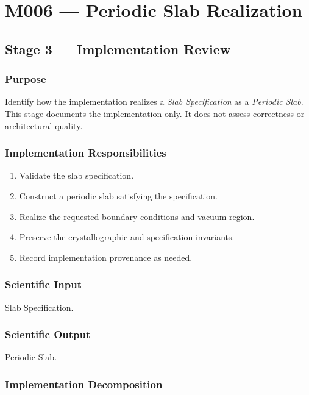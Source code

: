 \chapter{M006 --- Periodic Slab Realization}

\section{Stage 3 --- Implementation Review}

\subsection{Purpose}

Identify how the implementation realizes a \emph{Slab Specification} as a
\emph{Periodic Slab}. This stage documents the implementation only. It does
not assess correctness or architectural quality.

\subsection{Implementation Responsibilities}

\begin{enumerate}
\item Validate the slab specification.
\item Construct a periodic slab satisfying the specification.
\item Realize the requested boundary conditions and vacuum region.
\item Preserve the crystallographic and specification invariants.
\item Record implementation provenance as needed.
\end{enumerate}

\subsection{Scientific Input}

Slab Specification.

\subsection{Scientific Output}

Periodic Slab.

\subsection{Implementation Decomposition}


